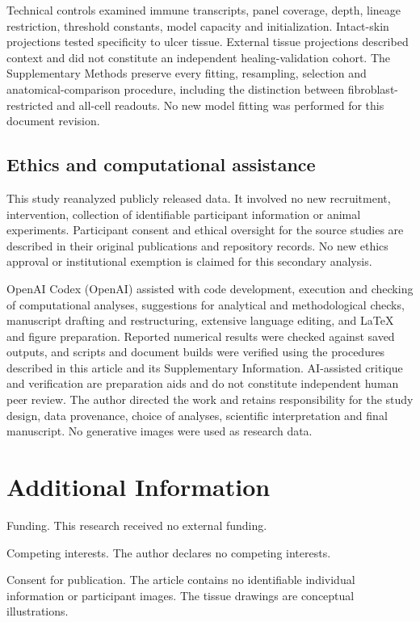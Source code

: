 \documentclass[10pt,a4paper]{article}
\begin{document}
Technical controls examined immune transcripts, panel coverage, depth, lineage restriction, threshold constants, model capacity and initialization. Intact-skin projections tested specificity to ulcer tissue. External tissue projections described context and did not constitute an independent healing-validation cohort. The Supplementary Methods preserve every fitting, resampling, selection and anatomical-comparison procedure, including the distinction between fibroblast-restricted and all-cell readouts. No new model fitting was performed for this document revision.

\subsection{Ethics and computational assistance}
This study reanalyzed publicly released data. It involved no new recruitment, intervention, collection of identifiable participant information or animal experiments. Participant consent and ethical oversight for the source studies are described in their original publications and repository records. No new ethics approval or institutional exemption is claimed for this secondary analysis.

OpenAI Codex (OpenAI) assisted with code development, execution and checking of computational analyses, suggestions for analytical and methodological checks, manuscript drafting and restructuring, extensive language editing, and LaTeX and figure preparation. Reported numerical results were checked against saved outputs, and scripts and document builds were verified using the procedures described in this article and its Supplementary Information. AI-assisted critique and verification are preparation aids and do not constitute independent human peer review. The author directed the work and retains responsibility for the study design, data provenance, choice of analyses, scientific interpretation and final manuscript. No generative images were used as research data.

\section*{Additional Information}
Funding. This research received no external funding.

Competing interests. The author declares no competing interests.





Consent for publication. The article contains no identifiable individual information or participant images. The tissue drawings are conceptual illustrations.
\end{document}
